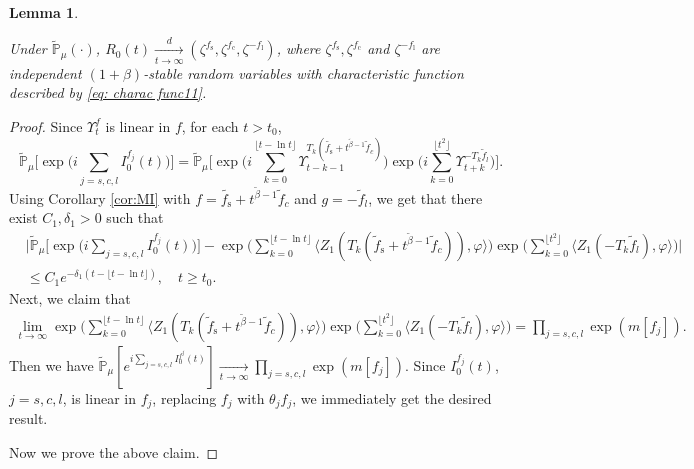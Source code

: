 \documentclass[12pt,a4paper]{amsart}
\theoremstyle{plain}
\newtheorem{lem}[thm]{Lemma}
\theoremstyle{definition}
\numberwithin{equation}{section}
\begin{document}
\begin{lem}\label{lem: U0T}

Under $\mathbb{\widetilde{P}}_{\mu}(\cdot)$,
 $R_0(t) \xrightarrow[t\to \infty]{d}(\zeta^{f_\mathrm s},\zeta^{f_\mathrm c},\zeta^{-f_\mathrm l})$, where $\zeta^{f_\mathrm s},\zeta^{f_\mathrm c}$ and $\zeta^{-f_\mathrm l}$ are independent $(1+\beta)$-stable random variables with characteristic function described by \eqref{eq: charac func11}.
\end{lem}
\begin{proof}
Since $\Upsilon_t^f$ is linear in $f$, for each $t>t_0$,
\[
\widetilde{\mathbb P}_{\mu}\Big[\exp\Big(i
\sum_{j=s,c,l}I_0^{f_j}(t)\Big)\Big]
= \widetilde{\mathbb P}_{\mu}\Big[\exp\Big(i\sum_{k=0}^{\lfloor t-\ln t \rfloor}\Upsilon_{t-k-1}^{T_k(\tilde{f_\mathrm s}+t^{\tilde{\beta}-1} \tilde{f}_c)}\Big)\exp\Big(i\sum_{k=0}^{\lfloor t^2 \rfloor}\Upsilon_{t+k}^{-T_k\tilde{f}_l}\Big)\Big].
\]
Using Corollary \ref{cor:MI} with $f=\tilde{f_\mathrm s}+t^{\tilde{\beta}-1} \tilde{f}_c$ and $g = -\tilde{f}_l$, we get that there exist $C_1,\delta_1 > 0$ such that
  \begin{align}
    &\Big|\widetilde{\mathbb P}_{\mu}\Big[\exp\Big(i
    \sum_{j=s,c,l}I_0^{f_j}(t)\Big)\Big]
    -\exp\Big(\sum_{k=0}^{\lfloor t-\ln t \rfloor} \langle Z_1(T_{k}(\tilde f_\mathrm s+t^{\tilde{\beta}-1}\tilde{f}_c)), \varphi\rangle \Big)\exp\Big(\sum_{k=0}^{\lfloor t^2 \rfloor}\langle Z_1(-T_k\tilde{f}_l),\varphi\rangle\Big)\Big|\\
    &\leq C_1 e^{-\delta_1(t - \lfloor t - \ln t\rfloor)},
    \quad t\geq t_0.
  \end{align}
Next, we claim that
\begin{align}
\lim_{t\rightarrow\infty}\exp\Big(\sum_{k=0}^{\lfloor t-\ln t \rfloor} \langle Z_1(T_{k}(\tilde f_\mathrm s+t^{\tilde{\beta}-1}\tilde{f}_c)), \varphi\rangle \Big)\exp\Big(\sum_{k=0}^{\lfloor t^2 \rfloor}\langle Z_1(-T_k\tilde{f}_l),\varphi\rangle\Big) =
\prod_{j=s,c,l}\exp(m[f_j]).
\end{align}
 Then we have
 $\mathbb{\widetilde{P}}_{\mu} [e^{i \sum_{j=s,c,l}I^{f^j}_0(t)} ]
 \xrightarrow[t\to \infty]{}  \prod_{j=s,c,l}\exp(m[f_j])$.
Since $I_0^{f_j}(t)$, $j=s,c,l$, is linear in $f_j$, replacing $f_j$ with $\theta_j f_j$, we immediately get the desired result.

Now we prove the above claim.


\end{proof}
\end{document}
